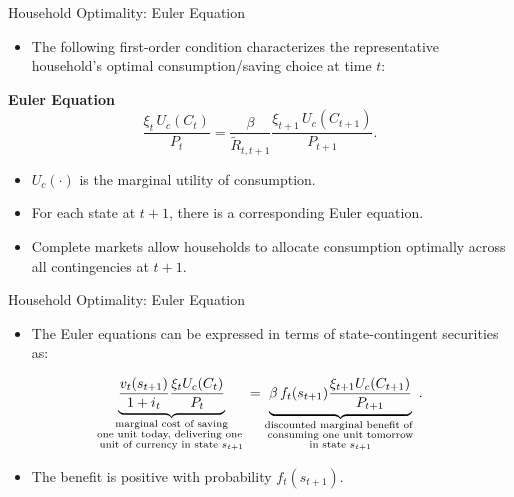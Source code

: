 \documentclass[11pt,aspectratio=169]{beamer}
\begin{document}
\begin{frame}[label=household_opt]{Household Optimality: Euler Equation}
\small

\begin{itemize}
  \item The following first-order condition characterizes the representative household’s optimal consumption/saving choice at time $t$:
\end{itemize}
\vspace{0.3cm}
\textbf{Euler Equation}
\begin{equation}
\frac{\xi_t \, U_c(C_t)}{P_t} = 
\frac{\beta}{\tilde{R}_{t,t+1}} \frac{\xi_{t+1} \, U_c(C_{t+1})}{P_{t+1}}.
\label{EulerCont}
\end{equation}

\begin{itemize}
  \item $U_c(\cdot)$ is the marginal utility of consumption.
  \item For each state at $t+1$, there is a corresponding Euler equation.
  \item Complete markets allow households to allocate consumption optimally across all contingencies at $t+1$.
\end{itemize}
\end{frame}

\begin{frame}[label=EulerStates]{Household Optimality: Euler Equation}
\small

\begin{itemize}
  \item The Euler equations can be expressed in terms of state-contingent securities as:
\end{itemize}

\vspace{0.3cm}
\begin{equation}
\underbrace{\frac{v_{t}(s_{t+1})}{1+i_t} \frac{\xi_t U_c(C_t)}{P_t}}_{\substack{\text{\scriptsize marginal cost of saving} \\ \text{\scriptsize one unit today, delivering one } \\ \text{\scriptsize unit of currency in state } s_{t+1}}}
=
\underbrace{\beta \, f_t(s_{t+1}) \frac{\xi_{t+1} U_c(C_{t+1})}{P_{t+1}}}_{\substack{\text{\scriptsize discounted marginal benefit of } \\ \text{\scriptsize consuming one unit tomorrow} \\ \text{\scriptsize in state } s_{t+1}}}.
\label{EulerStateContingent}
\end{equation}

\begin{itemize}
  \item The benefit is positive with probability $f_t(s_{t+1})$.
\end{itemize}

\end{frame}
\end{document}
